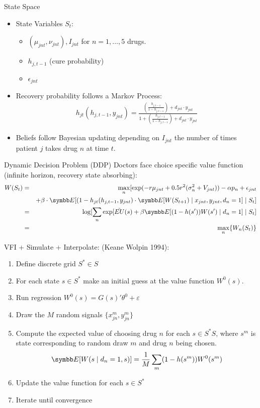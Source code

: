 \documentclass[aspectratio=169,11pt]{beamer}
\begin{document}
\begin{frame}{State Space}
\begin{itemize}
\item State Variables $S_t$:
\begin{itemize}
\item $(\mu_{jnt},\nu_{jnt}), I_{jnt}$ for $n=1,\ldots,5$ drugs.
\item $h_{j,t-1}$ (cure probability)
\item $\epsilon_{jnt}$
\end{itemize}
\item Recovery probability follows a Markov Process:
\begin{eqnarray*}
h_{jt}(h_{j,t-1},y_{jnt}) = \frac{ \left(\frac{h_{j,t-1}}{1-h_{j,t-1}} \right) + d_{jnt} \cdot y_{jnt}}  {1+ \left(\frac{h_{j,t-1}}{1-h_{j,t-1}} \right) + d_{jnt} \cdot y_{jnt}}  
\end{eqnarray*}
\item Beliefs follow Bayesian updating depending on $I_{jnt}$ the number of times patient $j$ takes drug $n$ at time $t$.
\end{itemize}
\end{frame}

\begin{frame}{Dynamic Decision Problem (DDP)}
Doctors face choice specific value function (infinite horizon, recovery state absorbing):
\begin{eqnarray*}
W(S_t) &=& \max_n [\exp(-r\mu_{jnt} + 0.5r^2(\sigma_n^2 + V_{jnt})) - \alpha p_n + \epsilon_{jnt}\\
&&+ \beta \cdot \E[(1-h_{jt}(h_{j,t-1},y_{jnt})\cdot  \E[W(S_{t+1}) \mid x_{jnt},y_{jnt},d_n=1] \mid S_t]\\
&=& \log [ \sum_n \exp[ \tilde{EU}(s) + \beta \E[(1-h(s'))W(s') \mid d_n=1] \mid S_t] \\
&=& \max_n \{W_n(S_t)\}
\end{eqnarray*}
\end{frame}


\begin{frame}{VFI + Simulate + Interpolate: (Keane Wolpin 1994): }
\begin{enumerate}
\item Define discrete grid $S^* \in S$
\item For each state $s \in S^*$ make an initial guess at the value function $W^0(s)$.
\item Run regression $W^0(s) = G(s)'\theta^0 + \varepsilon$
\item Draw the $M$ random signals $\{x_{jn}^m, y_{jn}^m\}$
\item Compute the expected value of choosing drug $n$ for each $s \in S^*S$, where $s^m$ is state corresponding to random draw $m$ and drug $n$ being chosen.
\begin{eqnarray*}
\E[W(s \mid d_n =1,s)] = \frac{1}{M} \sum_m (1-h(s^m)) W^0(s^m)
\end{eqnarray*}
\item Update the value function for each $s \in S^{*}$
\item Iterate until convergence
\end{enumerate}
\end{frame}
\end{document}
